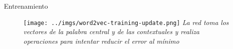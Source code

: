 \documentclass{beamer}
\begin{document}
\begin{frame}{Entrenamiento}
\begin{figure}
    \centering
    \begin{minipage}{0.65\textwidth}
        \centering
        \texttt{[image: ../imgs/word2vec-training-update.png]}
        {\scriptsize \textit{La red toma los vectores de la palabra central y de las contextuales y realiza operaciones para intentar reducir el error al mínimo}}
    \end{minipage}
\end{figure}


\end{frame}

%	
%
%
%
%
%    
%
\end{document}
